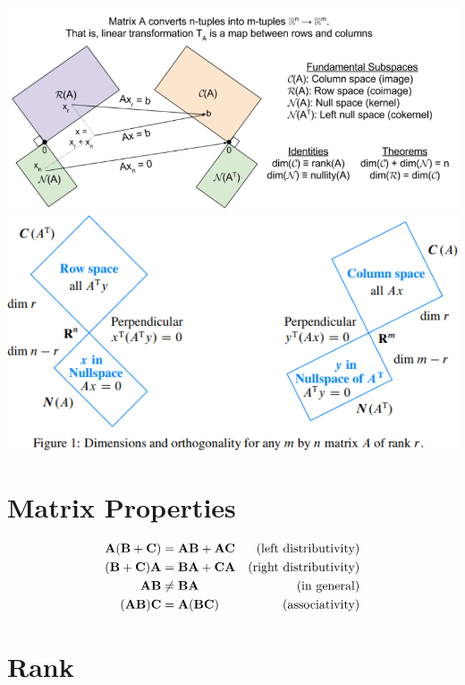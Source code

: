 \begin{center}
\includegraphics[width=\textwidth]{imgs/fund_theorem_lin_alg4.png}
\includegraphics[width=\textwidth]{imgs/fund_theorem_lin_alg5.png}
\end{center}


\section{Matrix Properties}

\begin{align}
\mathbf{A}(\mathbf{B}+\mathbf{C}) &=   \mathbf{A}\mathbf{B}+\mathbf{A}\mathbf{C} &\textrm{(left distributivity)}   \\
(\mathbf{B}+\mathbf{C})\mathbf{A} &=   \mathbf{B}\mathbf{A}+\mathbf{C}\mathbf{A} &\textrm{(right distributivity)}  \\
\mathbf{A}\mathbf{B}       &\ne \mathbf{B}\mathbf{A}        &\textrm{(in general)}            \\
(\mathbf{A}\mathbf{B})\mathbf{C}  &=   \mathbf{A}(\mathbf{B}\mathbf{C})   &\textrm{(associativity)}
\end{align}

\section{Rank}

